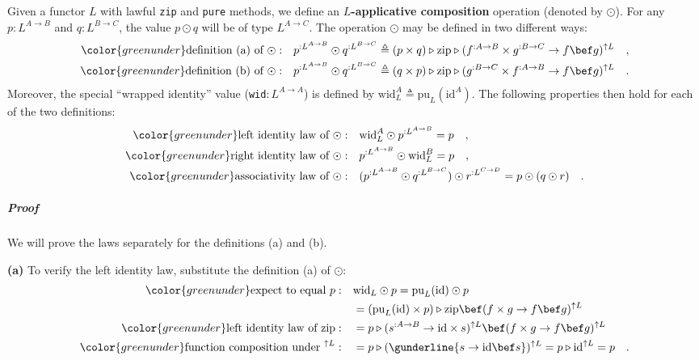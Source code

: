 Given a functor $L$ with lawful \lstinline!zip! and \lstinline!pure!
methods, we define an \textbf{$L$-applicative
composition} operation (denoted by $\odot$). For any $p:L^{A\rightarrow B}$
and $q:L^{B\rightarrow C}$, the value $p\odot q$ will be of type
$L^{A\rightarrow C}$. The operation $\odot$ may be defined in two
different ways:
\begin{align*}
{\color{greenunder}\text{definition (a) of }\odot:}\quad & p^{:L^{A\rightarrow B}}\odot q^{:L^{B\rightarrow C}}\triangleq(p\times q)\triangleright\text{zip}\triangleright(f^{:A\rightarrow B}\times g^{:B\rightarrow C}\rightarrow f\bef g)^{\uparrow L}\quad,\\
{\color{greenunder}\text{definition (b) of }\odot:}\quad & p^{:L^{A\rightarrow B}}\odot q^{:L^{B\rightarrow C}}\triangleq(q\times p)\triangleright\text{zip}\triangleright(g^{:B\rightarrow C}\times f^{:A\rightarrow B}\rightarrow f\bef g)^{\uparrow L}\quad.
\end{align*}
Moreover, the special \textsf{``}wrapped identity\textsf{''} value (\lstinline!wid!$:L^{A\rightarrow A}$)
is defined by $\text{wid}_{L}^{A}\triangleq\text{pu}_{L}(\text{id}^{A})$.
The following properties then hold for each of the two definitions:
\begin{align*}
{\color{greenunder}\text{left identity law of }\odot:}\quad & \text{wid}_{L}^{A}\odot p^{:L^{A\rightarrow B}}=p\quad,\\
{\color{greenunder}\text{right identity law of }\odot:}\quad & p^{:L^{A\rightarrow B}}\odot\text{wid}_{L}^{B}=p\quad,\\
{\color{greenunder}\text{associativity law of }\odot:}\quad & (p^{:L^{A\rightarrow B}}\odot q^{:L^{B\rightarrow C}})\odot r^{:L^{C\rightarrow D}}=p\odot(q\odot r)\quad.
\end{align*}


\subparagraph{Proof}

We will prove the laws separately for the definitions (a) and (b).

\textbf{(a)} To verify the left identity law, substitute the definition
(a) of $\odot$:
\begin{align*}
{\color{greenunder}\text{expect to equal }p:}\quad & \text{wid}_{L}\odot p=\text{pu}_{L}(\text{id})\odot p\\
 & =(\text{pu}_{L}(\text{id})\times p)\triangleright\text{zip}\bef(f\times g\rightarrow f\bef g)^{\uparrow L}\\
{\color{greenunder}\text{left identity law of }\text{zip}:}\quad & =p\triangleright(s^{:A\rightarrow B}\rightarrow\text{id}\times s)^{\uparrow L}\bef(f\times g\rightarrow f\bef g)^{\uparrow L}\\
{\color{greenunder}\text{function composition under }^{\uparrow L}:}\quad & =p\triangleright(\gunderline{s\rightarrow\text{id}\bef s})^{\uparrow L}=p\triangleright\text{id}^{\uparrow L}=p\quad.
\end{align*}

